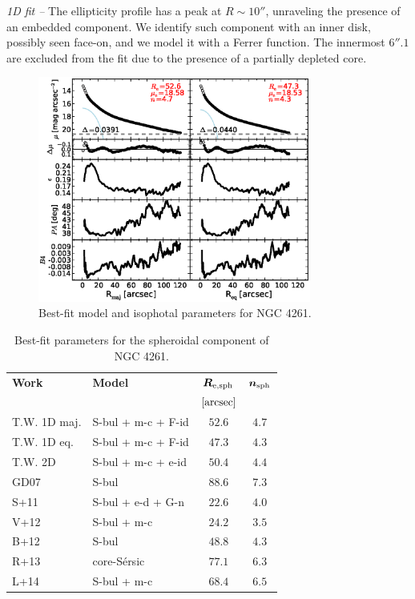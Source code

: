 \documentclass[preprint2]{emulateapj}
\newcommand{\fitfigurewidth}{0.8\textwidth}
\begin{document}
  \emph{1D fit -- }
  The ellipticity profile has a peak at $R \sim 10''$, unraveling the presence of an embedded component.
  We identify such component with an inner disk, possibly seen face-on, and we model it with a Ferrer function.
  The innermost $6''.1$ are excluded from the fit due to the presence of a partially depleted core.

  \begin{figure}[h]
  \begin{center}
  \includegraphics[width=\fitfigurewidth]{images/n4261_1Dfit.eps}
  \caption{Best-fit model and isophotal parameters for NGC 4261.}
  \end{center}
  \end{figure}

  \begin{table}[h]
  \small
  \caption{Best-fit parameters for the spheroidal component of NGC 4261.}
  \begin{center}
  \begin{tabular}{llcc}
  \hline
  {\bf Work} & {\bf Model}   & $\bm R_{\rm e,sph}$    & $\bm n_{\rm sph}$ \\
    &  &  $[\rm arcsec]$ & \\
  \hline
  T.W. 1D maj. & S-bul + m-c + F-id & $52.6$  &  $4.7$ \\
  T.W. 1D eq.  & S-bul + m-c + F-id & $47.3$  &  $4.3$ \\
  T.W. 2D      & S-bul + m-c + e-id & $50.4$  &  $4.4$ \\
  \hline
  GD07      & S-bul		& $88.6$  &  $7.3$ \\
  S+11      & S-bul + e-d + G-n & $22.6$  &  $4.0$ \\
  V+12      & S-bul + m-c	& $24.2$  &  $3.5$ \\
  B+12      & S-bul		& $48.8$  &  $4.3$ \\
  R+13      & core-S\'ersic	& $77.1$  &  $6.3$ \\
  L+14      & S-bul + m-c	& $68.4$  &  $6.5$ \\
  \hline
  \end{tabular}
  \end{center}
  \label{tab:n4261}
  \end{table}
\end{document}
